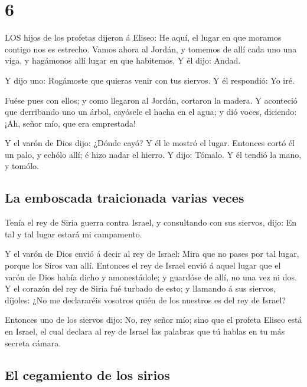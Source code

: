 \hypertarget{section-5}{%
\section{6}\label{section-5}}

 LOS hijos de los profetas dijeron á Eliseo: He aquí, el
lugar en que moramos contigo nos es estrecho.  Vamos ahora
al Jordán, y tomemos de allí cada uno una viga, y hagámonos allí lugar
en que habitemos. Y él dijo: Andad.

 Y dijo uno: Rogámoste que quieras venir con tus siervos. Y
él respondió: Yo iré.

 Fuése pues con ellos; y como llegaron al Jordán, cortaron
la madera.  Y aconteció que derribando uno un árbol,
cayósele el hacha en el agua; y dió voces, diciendo: ¡Ah, señor mío, que
era emprestada!

 Y el varón de Dios dijo: ¿Dónde cayó? Y él le mostró el
lugar. Entonces cortó él un palo, y echólo allí; é hizo nadar el hierro.
 Y dijo: Tómalo. Y él tendió la mano, y tomólo.

\hypertarget{la-emboscada-traicionada-varias-veces}{%
\subsection{La emboscada traicionada varias
veces}\label{la-emboscada-traicionada-varias-veces}}

 Tenía el rey de Siria guerra contra Israel, y consultando
con sus siervos, dijo: En tal y tal lugar estará mi campamento.

 Y el varón de Dios envió á decir al rey de Israel: Mira que
no pases por tal lugar, porque los Siros van allí. 
Entonces el rey de Israel envió á aquel lugar que el varón de Dios había
dicho y amonestádole; y guardóse de allí, no una vez ni dos.
 Y el corazón del rey de Siria fué turbado de esto; y
llamando á sus siervos, díjoles: ¿No me declararéis vosotros quién de
los nuestros es del rey de Israel?

 Entonces uno de los siervos dijo: No, rey señor mío; sino
que el profeta Eliseo está en Israel, el cual declara al rey de Israel
las palabras que tú hablas en tu más secreta cámara.

\hypertarget{el-cegamiento-de-los-sirios}{%
\subsection{El cegamiento de los
sirios}\label{el-cegamiento-de-los-sirios}}

